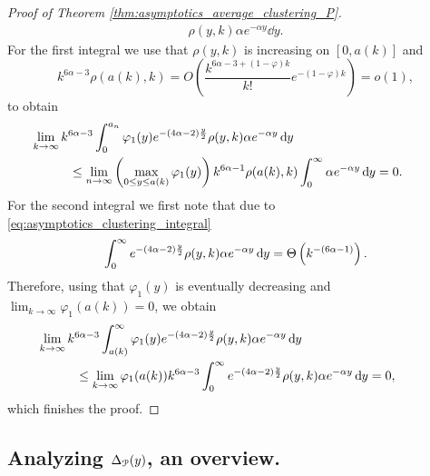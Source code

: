 \begin{proof}[Proof of Theorem \ref{thm:asymptotics_average_clustering_P}]
\begin{align*}
    	\rho(y,k) \alpha e^{-\alpha y} \dd y.
\end{align*} 
For the first integral we use that $\rho(y,k)$ is increasing on $[0,a(k)]$ and
\[
	k^{6\alpha - 3}\rho(a(k),k) = O\left(\frac{k^{6\alpha - 3 + (1-\varphi)k}}{k!} e^{-(1-\varphi)k}\right) = o(1),
\]
to obtain
\begin{align*}
	&\hspace{-30pt}\lim_{k \to \infty} k^{6\alpha - 3} \int_0^{a_n} \varphi_1(y) e^{-(4\alpha - 2)\frac{y}{2}} 
    	\rho(y,k) \alpha e^{-\alpha y} \dd y\\
	&\le \lim_{n \to \infty} \left(\max_{0 \le y \le a(k)} \varphi_1(y)\right) k^{6\alpha - 1} 
    	\rho(a(k), k) \int_0^\infty \alpha e^{-\alpha y} \dd y = 0.
\end{align*}
For the second integral we first note that due to \eqref{eq:asymptotics_clustering_integral}
\[
	\int_0^\infty e^{-(4\alpha - 2)\frac{y}{2}} \rho(y,k) \alpha e^{-\alpha y} \operatorname{\mathrm{d}\hspace{-2pt}} y = \Theta\left(k^{-(6\alpha - 1)}\right).
\] 
Therefore, using that $\varphi_1(y)$ is eventually decreasing and $\lim_{k \to \infty} \varphi_1(a(k)) = 0$, we obtain
\begin{align*}
	&\hspace{-30pt}\lim_{k \to \infty} k^{6\alpha - 3} \int_{a(k)}^{\infty} \varphi_1(y) 
    	e^{-(4\alpha - 2)\frac{y}{2}} \rho(y,k) \alpha e^{-\alpha y} \dd y\\
	&\le \lim_{k \to \infty} \varphi_1(a(k)) k^{6\alpha - 3} \int_0^\infty 
    	e^{-(4\alpha - 2)\frac{y}{2}} \rho(y,k) \alpha e^{-\alpha y} \dd y = 0,
\end{align*}
which finishes the proof.
\end{proof}

\subsection{Analyzing $\Delta_{{\mathcal P}}(y)$, an overview.}\label{ssec:asymptotics_Delta_y_P}

